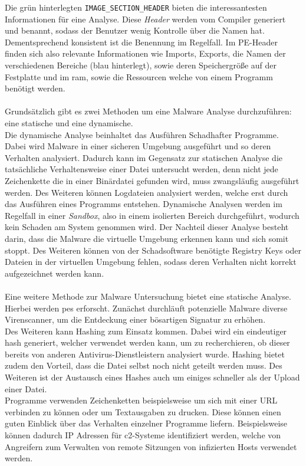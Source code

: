 \documentclass[
    12pt, %
    DIV10,
    ngerman, %
    a4paper, %
    oneside, %
    titlepage, %
    parskip=half, %
    headings=normal, %
    listof=totoc, %
    bibliography=totoc, %
    index=totoc, %
    captions=tableheading, %
    final %
]{scrreprt}
\begin{document}
Die grün hinterlegten \texttt{IMAGE\_SECTION\_HEADER} bieten die interessantesten Informationen für eine Analyse. Diese \emph{Header} werden vom Compiler generiert und benannt, sodass der Benutzer wenig Kontrolle über die Namen hat. Dementsprechend konsistent ist die Benennung im Regelfall. Im PE-Header finden sich also relevante Informationen wie Imports, Exports, die Namen der verschiedenen Bereiche (blau hinterlegt), sowie deren Speichergrö{\ss}e auf der Festplatte und im \ac{ram}, sowie die Ressourcen welche von einem Programm benötigt werden.
\\\\
Grundsätzlich gibt es zwei Methoden um eine Malware Analyse durchzuführen: eine statische und eine dynamische.\\
Die dynamische Analyse beinhaltet das Ausführen Schadhafter Programme. Dabei wird Malware in einer sicheren Umgebung ausgeführt und so deren Verhalten analysiert. Dadurch kann im Gegensatz zur statischen Analyse die tatsächliche Verhaltensweise einer Datei untersucht werden, denn nicht jede Zeichenkette die in einer Binärdatei gefunden wird, muss zwangsläufig ausgeführt werden. Des Weiteren können Logdateien analysiert werden, welche erst durch das Ausführen eines Programms entstehen.
Dynamische Analysen werden im Regelfall in einer \emph{Sandbox}, also in einem isolierten Bereich durchgeführt, wodurch kein Schaden am System genommen wird.
Der Nachteil dieser Analyse besteht darin, dass die Malware die virtuelle Umgebung erkennen kann und sich somit stoppt. Des Weiteren können von der Schadsoftware benötigte Registry Keys oder Dateien in der virtuellen Umgebung fehlen, sodass deren Verhalten nicht korrekt aufgezeichnet werden kann.\\\\
Eine weitere Methode zur Malware Untersuchung bietet eine statische Analyse. Hierbei werden \ac{pes} erforscht. Zunächst durchläuft potenzielle Malware diverse Virenscanner, um die Entdeckung einer bösartigen Signatur zu erhöhen.\\ 
Des Weiteren kann Hashing zum Einsatz kommen. Dabei wird ein eindeutiger hash generiert, welcher verwendet werden kann, um zu recherchieren, ob dieser bereits von anderen Antivirus-Dienstleistern analysiert wurde. Hashing bietet zudem den Vorteil, dass die Datei selbst noch nicht geteilt werden muss. Des Weiteren ist der Austausch eines Hashes auch um einiges schneller als der Upload einer Datei.\\
Programme verwenden Zeichenketten beispielsweise um sich mit einer URL verbinden zu können oder um Textausgaben zu drucken. Diese können einen guten Einblick über das Verhalten einzelner Programme liefern. Beispielsweise können dadurch IP Adressen für \ac{c2}-Systeme identifiziert werden, welche von Angreifern zum Verwalten von remote Sitzungen von infizierten Hosts verwendet werden.\\
\end{document}
